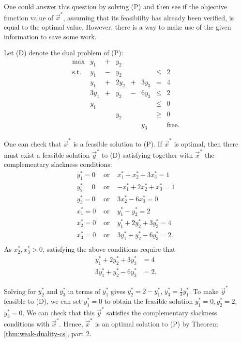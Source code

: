 \begin{solution}
One could answer this question by solving (P) and then see if the
objective function value of \(\vec{x}^*\), assuming that its feasibiilty
has already been verified, is equal to the optimal value. However, there
is a way to make use of the given information to save some work.

Let (D) denote the dual problem of (P): \[\begin{array}{rrcrcrlll}
\max & y_1 & +& y_2  &   &       \\
\mbox{s.t.} 
&  y_1 & - &  y_2 &   &       & \leq & 2  \\
&  y_1 & + & 2y_2 & + & 3y_3  & = & 4  \\
& 3y_1 & + &  y_2 & - & 6y_3  & \leq & 2  \\
&  y_1 &   &     &    &      & \leq & 0 \\
&      &   & y_2  &   &      & \geq   &  0 \\
&      &   &     &    & y_3  &    & \mbox{free.}
\end{array}\]

One can check that \(\vec{x}^*\) is a feasible solution to (P). If
\(\vec{x}^*\) is optimal, then there must exist a feasible solution
\(\vec{y}^*\) to (D) satisfying together with \(\vec{x}^*\) the
complementary slackness conditions: \[
\begin{array}{llr}
 y_1^* = 0 & \mbox{ or } &  x_1^* + x_2^* + 3x_3^* = 1 \\
 y_2^* = 0 & \mbox{ or } & -x_1^* + 2x_2^* + x_3^* = 1 \\
 y_3^* = 0 & \mbox{ or } &   3x_2^* - 6x_3^*  = 0 \\
 x_1^* = 0 & \mbox{ or } &  y_1^* -  y_2^*  =  2 \\
 x_2^* = 0 & \mbox{ or } &  y_1^*  + 2y_2^* + 3y_3^*  =  4 \\
 x_3^* = 0 & \mbox{ or } & 3y_1^*  + y_2^* - 6y_3^*  =  2. \\
\end{array}
\] As \(x_2^*, x_3^* \gt 0\), satisfying the above conditions require
that
\begin{align*} 
  y_1^*  + 2y_2^* + 3y_3^* &= 4  \\
  3y_1^*  + y_2^* - 6y_3^* &=  2.
\end{align*}

Solving for \(y_2^*\) and \(y_3^*\) in terms of \(y_1^*\) gives
\(y_2^* = 2 - y_1^*\), \(y_3^* = \frac{1}{3}y_1^*\). To make
\(\vec{y}^*\) feasible to (D), we can set \(y_1^* = 0\) to obtain the
feasible solution \(y_1^* = 0, y_2^* = 2\), \(y_3^* = 0\). We can check
that this \(\vec{y}^*\) satisfies the complementary slackness conditions
with \(\vec{x}^*\). Hence, \(\vec{x}^*\) is an optimal solution to (P)
by Theorem \ref{thm:weak-duality-cs}, part 2.
\end{solution}

